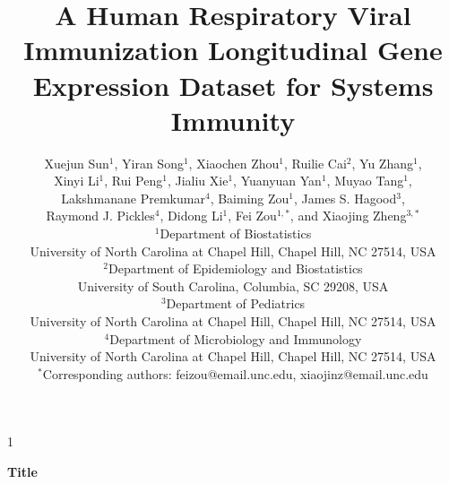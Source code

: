\documentclass[
  12pt]{article}
\newcommand{\anon}{1}
\begin{document}
\def\spacingset#1{\renewcommand{\baselinestretch}%
{#1}\small\normalsize} \spacingset{1}



\title{\bf A Human Respiratory Viral Immunization Longitudinal Gene Expression Dataset for Systems Immunity}

\newif\ifanonymous
\anonymoustrue   %


  \author{
  Xuejun Sun$^{1}$, Yiran Song$^{1}$, Xiaochen Zhou$^{1}$, Ruilie Cai$^{2}$, Yu Zhang$^{1}$,\\
  Xinyi Li$^{1}$, Rui Peng$^{1}$, Jialiu Xie$^{1}$, Yuanyuan Yan$^{1}$, Muyao Tang$^{1}$,\\
  Lakshmanane Premkumar$^{4}$, Baiming Zou$^{1}$, James S. Hagood$^{3}$,\\
  Raymond J. Pickles$^{4}$, Didong Li$^{1}$, Fei Zou$^{1,*}$, and Xiaojing Zheng$^{3,*}$\\[8pt]
  $^{1}$Department of Biostatistics\\
  University of North Carolina at Chapel Hill, Chapel Hill, NC 27514, USA\\[4pt]
  $^{2}$Department of Epidemiology and Biostatistics\\
  University of South Carolina, Columbia, SC 29208, USA\\[4pt]
  $^{3}$Department of Pediatrics\\
  University of North Carolina at Chapel Hill, Chapel Hill, NC 27514, USA\\[4pt]
  $^{4}$Department of Microbiology and Immunology\\
  University of North Carolina at Chapel Hill, Chapel Hill, NC 27514, USA\\[8pt]
  $^{*}$Corresponding authors: feizou@email.unc.edu, xiaojinz@email.unc.edu
  }


\maketitle

\anon
{
  \bigskip
  \bigskip
  \bigskip
  \begin{center}
    {\LARGE\bf Title}
\end{center}
  \medskip
} \fi
\end{document}
